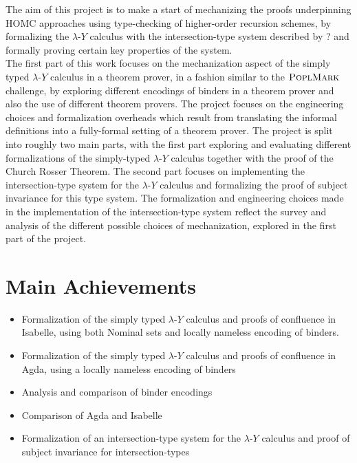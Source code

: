 \documentclass[a4paper, 12pt, twoside]{style/ociamthesis}
\theoremstyle{plain}
\theoremstyle{definition}
\theoremstyle{remark}
\providecommand{\tightlist}{%
  \setlength{\itemsep}{0pt}\setlength{\parskip}{0pt}}
\newcommand{\lamy}{\lambda\text{-}Y}
\newcommand{\poplm}{\textsc{PoplMark}}
\begin{document}
The aim of this project is to make a start of mechanizing the proofs
underpinning HOMC approaches using type-checking of higher-order
recursion schemes, by formalizing the \(\lamy\) calculus with the
intersection-type system described by ? and formally proving certain key
properties of the system.\\
The first part of this work focuses on the mechanization aspect of the
simply typed \(\lamy\) calculus in a theorem prover, in a fashion
similar to the \(\poplm\) challenge, by exploring different encodings of
binders in a theorem prover and also the use of different theorem
provers. The project focuses on the engineering choices and
formalization overheads which result from translating the informal
definitions into a fully-formal setting of a theorem prover. The project
is split into roughly two main parts, with the first part exploring and
evaluating different formalizations of the simply-typed \(\lamy\)
calculus together with the proof of the Church Rosser Theorem. The
second part focuses on implementing the intersection-type system for the
\(\lamy\) calculus and formalizing the proof of subject invariance for
this type system. The formalization and engineering choices made in the
implementation of the intersection-type system reflect the survey and
analysis of the different possible choices of mechanization, explored in
the first part of the project.

\section{Main Achievements}\label{main-achievements}

\begin{itemize}
\tightlist
\item
  Formalization of the simply typed \(\lamy\) calculus and proofs of
  confluence in Isabelle, using both Nominal sets and locally nameless
  encoding of binders.
\item
  Formalization of the simply typed \(\lamy\) calculus and proofs of
  confluence in Agda, using a locally nameless encoding of binders
\item
  Analysis and comparison of binder encodings
\item
  Comparison of Agda and Isabelle
\item
  Formalization of an intersection-type system for the \(\lamy\)
  calculus and proof of subject invariance for intersection-types
\end{itemize}
\end{document}
